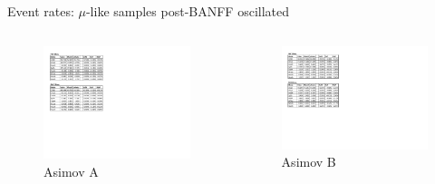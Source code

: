 \documentclass{beamer}
\begin{document}
\begin{frame}{Event rates: $\mu$-like samples post-BANFF oscillated}
	\centering

	\begin{columns}
		\begin{column}{0.5\paperwidth}
			\begin{figure}
				\includegraphics[page=1, trim={0cm 9cm 13cm 1cm}, clip, scale=0.52] {images/rates/postfit_A}
				\caption{Asimov A}
			\end{figure}
		\end{column}
		\begin{column}{0.5\paperwidth}
			\begin{figure}
				\includegraphics[page=1, trim={0cm 8.4cm 13cm 1cm}, clip, scale=0.52] {images/rates/postfit_B}
				\caption{Asimov B}
			\end{figure}
		\end{column}
	\end{columns}
\end{frame}
\end{document}
